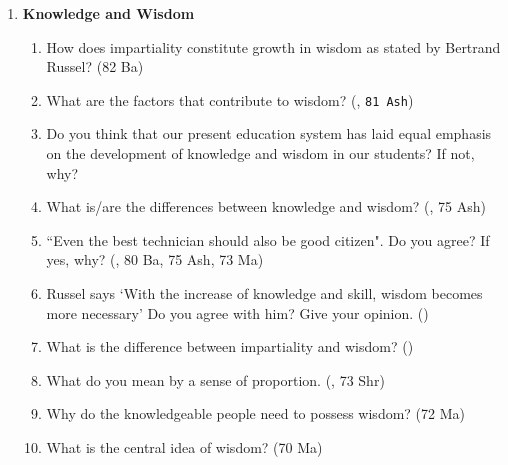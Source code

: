 \documentclass[12pt]{article}
\begin{document}
\begin{enumerate}
\begin{enumerate}
        \item What is the theme of `How much land does a man need?' \hfill ()

        \item Explain the irony of the story ``How Much Land Does a Man Need". \hfill (\texttt{81 Ash})

        \item What lesson can we learn from the text? \hfill ()
      \end{enumerate}

    \item \textbf{Knowledge and Wisdom}
      \begin{enumerate}
        \item How does impartiality constitute growth in wisdom as stated by Bertrand Russel? \hfill (82 Ba)

        \item What are the factors that contribute to wisdom? \hfill (, \texttt{81 Ash})

        \item Do you think that our present education system has laid equal emphasis on the development of knowledge and wisdom in our students? If not, why?

        \item What is/are the differences between knowledge and wisdom? \hfill (, 75 Ash)

        \item ``Even the best technician should also be good citizen". Do you agree? If yes, why? \hfill (, 80 Ba, 75 Ash, 73 Ma)

        \item Russel says `With the increase of knowledge and skill, wisdom becomes more necessary' Do you agree with him? Give your opinion. \hfill ()

        \item What is the difference between impartiality and wisdom? \hfill ()

        \item What do you mean by a sense of proportion. \hfill (, 73 Shr)

        \item Why do the knowledgeable people need to possess wisdom? \hfill (72 Ma)

        \item What is the central idea of wisdom? \hfill (70 Ma)


\end{enumerate}
\end{enumerate}
\end{document}
